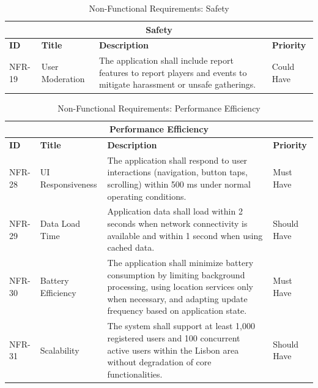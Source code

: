 \vspace{1cm}

\begin{table}[h]
	\centering
	\caption{Non-Functional Requirements: Safety}
	\label{tab:nfr-safety}
	\begin{tabular}{p{2cm}p{4cm}p{7cm}p{2cm}}
		\toprule
		\multicolumn{4}{c}{\textbf{Safety}}\\
		\midrule
		\textbf{ID} & \textbf{Title} & \textbf{Description} & \textbf{Priority} \\
		\midrule
		NFR-19 & User Moderation & The application shall include report features to report players and events to mitigate harassment or unsafe gatherings. & Could Have \\
		\bottomrule
	\end{tabular}
\end{table}

\vspace{1cm}

\begin{table}[h]
	\centering
	\caption{Non-Functional Requirements: Performance Efficiency}
	\label{tab:nfr-performance}
	\begin{tabular}{p{2cm}p{4cm}p{7cm}p{2cm}}
		\toprule
		\multicolumn{4}{c}{\textbf{Performance Efficiency}}\\
		\midrule
		\textbf{ID} & \textbf{Title} & \textbf{Description} & \textbf{Priority} \\
		\midrule
		NFR-28 & UI Responsiveness & The application shall respond to user interactions (navigation, button taps, scrolling) within 500 ms under normal operating conditions. & Must Have \\
		\midrule
		NFR-29 & Data Load Time & Application data shall load within 2 seconds when network connectivity is available and within 1 second when using cached data. & Should Have \\
		\midrule
		NFR-30 & Battery Efficiency & The application shall minimize battery consumption by limiting background processing, using location services only when necessary, and adapting update frequency based on application state. & Must Have \\
		\midrule
		NFR-31 & Scalability & The system shall support at least 1,000 registered users and 100 concurrent active users within the Lisbon area without degradation of core functionalities. & Should Have \\
		\bottomrule
	\end{tabular}
\end{table}


